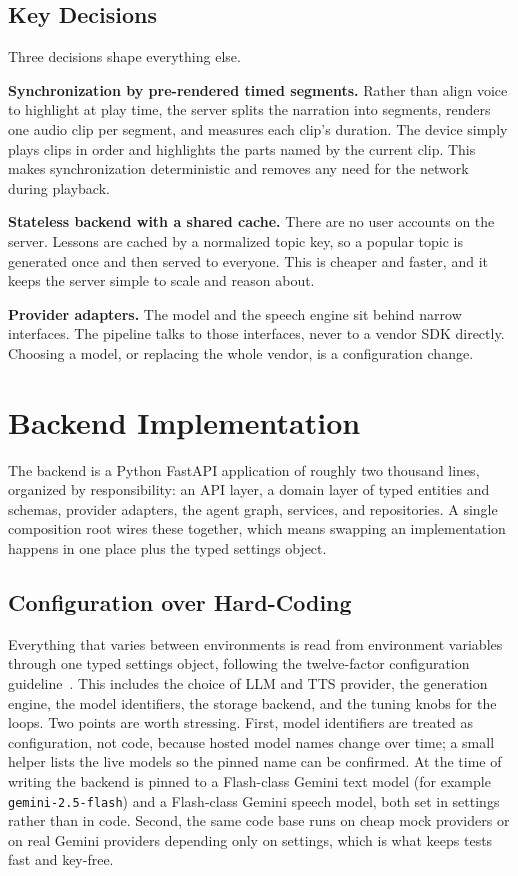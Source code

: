 \documentclass[conference]{IEEEtran}
\begin{document}
\subsection{Key Decisions}
Three decisions shape everything else.

\textbf{Synchronization by pre-rendered timed segments.} Rather than align voice
to highlight at play time, the server splits the narration into segments,
renders one audio clip per segment, and measures each clip's duration. The
device simply plays clips in order and highlights the parts named by the current
clip. This makes synchronization deterministic and removes any need for the
network during playback.

\textbf{Stateless backend with a shared cache.} There are no user accounts on the
server. Lessons are cached by a normalized topic key, so a popular topic is
generated once and then served to everyone. This is cheaper and faster, and it
keeps the server simple to scale and reason about.

\textbf{Provider adapters.} The model and the speech engine sit behind narrow
interfaces. The pipeline talks to those interfaces, never to a vendor SDK
directly. Choosing a model, or replacing the whole vendor, is a configuration
change.

\section{Backend Implementation}
\label{sec:backend}

The backend is a Python FastAPI application of roughly two thousand lines,
organized by responsibility: an API layer, a domain layer of typed entities and
schemas, provider adapters, the agent graph, services, and repositories. A
single composition root wires these together, which means swapping an
implementation happens in one place plus the typed settings object.

\subsection{Configuration over Hard-Coding}
Everything that varies between environments is read from environment variables
through one typed settings object, following the twelve-factor configuration
guideline~\cite{twelvefactor}. This includes the choice of LLM and TTS provider,
the generation engine, the model identifiers, the storage backend, and the tuning
knobs for the loops. Two points are worth stressing. First, model identifiers are
treated as configuration, not code, because hosted model names change over time;
a small helper lists the live models so the pinned name can be confirmed. At the
time of writing the backend is pinned to a Flash-class Gemini text model (for
example \texttt{gemini-2.5-flash}) and a Flash-class Gemini speech model, both set
in settings rather than in code. Second, the same code base runs on cheap mock
providers or on real Gemini providers depending only on settings, which is what
keeps tests fast and key-free.
\end{document}
